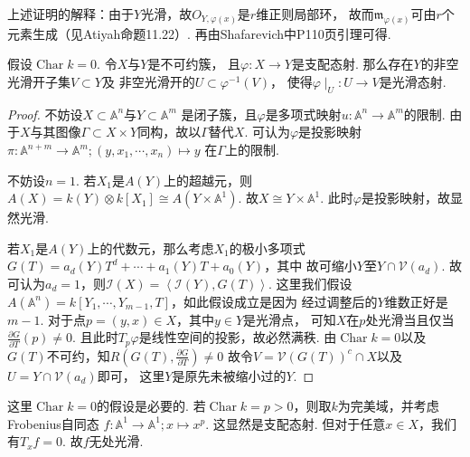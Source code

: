     \begin{remark}
        上述证明的解释：由于$Y$光滑，故$O_{Y,\varphi(x)}$是$r$维正则局部环，
        故而$\mathfrak{m}_{\varphi(x)}$可由$r$个元素生成（见Atiyah命题11.22）. 
        再由Shafarevich中P110页引理可得.   
    \end{remark}

    \begin{theorem}
      假设$\operatorname{Char} k =0$. 令$X$与$Y$是不可约簇，
      且$\varphi\colon X \rightarrow Y$是支配态射. 
      那么存在$Y$的非空光滑开子集$V \subset Y$及
      非空光滑开的$U \subset \varphi^{-1}(V)$，
      使得$\varphi\mid_{U}\colon U \rightarrow V$是光滑态射.
    \end{theorem}
    \begin{proof}
        不妨设$X \subset \mathbb{A}^{n}$与$Y \subset \mathbb{A}^{m}$
        是闭子簇，且$\varphi$是多项式映射$u\colon\mathbb{A}^{n} \rightarrow \mathbb{A}^{m}$的限制. 
        由于$X$与其图像$\Gamma \subset X \times Y$同构，故以$\Gamma$替代$X$. 可认为$\varphi$是投影映射
        $\pi\colon\mathbb{A}^{n+m} \rightarrow \mathbb{A}^{m};(y,x_{1},\cdots,x_{n})\mapsto y$
        在$\Gamma$上的限制. \par
        不妨设$n=1$.
        若$X_{1}$是$A(Y)$上的超越元，则$A(X)=k(Y) \otimes k[X_{1}] \cong A(Y \times \mathbb{A}^{1})$.
        故$X \cong Y \times \mathbb{A}^{1}$. 此时$\varphi$是投影映射，故显然光滑. \par
        若$X_{1}$是$A(Y)$上的代数元，那么考虑$X_{1}$的极小多项式
        $G(T)=a_{d}(Y)T^{d}+\cdots+a_{1}(Y)T+a_{0}(Y)$，其中 故可缩小$Y$至$Y \cap \mathcal{V}(a_{d})$.
        故可认为$a_{d}=1$，则$\mathcal{I}(X)=\left<\mathcal{I}(Y),G(T)\right>$. 
        这里我们假设$A(\mathbb{A}^{n})=k[Y_{1},\cdots,Y_{m-1},T]$，如此假设成立是因为
        经过调整后的$Y$维数正好是$m-1$. 对于点$p=(y,x) \in X$，其中$y \in Y$是光滑点，
        可知$X$在$p$处光滑当且仅当$\frac{\partial G}{\partial T}(p) \neq 0$. 
        且此时$T_{p}\varphi$是线性空间的投影，故必然满秩. 
        由$\operatorname{Char}k = 0$以及$G(T)$不可约，知$R(G(T),\frac{\partial G}{\partial T}) \neq 0$
        故令$V=\mathcal{V}(G(T))^{c} \cap X$以及$U=Y \cap \mathcal{V}(a_{d})$即可，
        这里$Y$是原先未被缩小过的$Y$.
    \end{proof}

    \begin{remark}
        这里$\operatorname{Char}k=0$的假设是必要的. 
        若$\operatorname{Char}k=p>0$，则取$k$为完美域，并考虑Frobenius自同态
        $f\colon\mathbb{A}^{1} \rightarrow \mathbb{A}^{1};x \mapsto x^{p}$. 
        这显然是支配态射. 但对于任意$x \in X$，我们有$T_{x}f=0$. 故$f$无处光滑.
    \end{remark}

